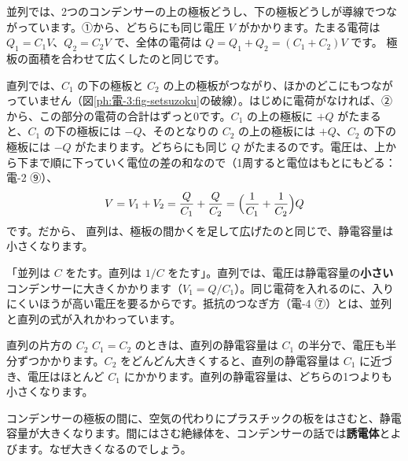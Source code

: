 並列では、2つのコンデンサーの上の極板どうし、下の極板どうしが導線でつながっています。①から、どちらにも同じ電圧 $V$ がかかります。たまる電荷は $Q_1=C_1V$、$Q_2=C_2V$ で、全体の電荷は $Q=Q_1+Q_2=(C_1+C_2)V$ です。
極板の面積を合わせて広くしたのと同じです。

直列では、$C_1$ の下の極板と $C_2$ の上の極板がつながり、ほかのどこにもつながっていません（図\ref{ph:電-3:fig-setsuzoku}の破線）。はじめに電荷がなければ、②から、この部分の電荷の合計はずっと0です。$C_1$ の上の極板に $+Q$ がたまると、$C_1$ の下の極板には $-Q$、そのとなりの $C_2$ の上の極板には $+Q$、$C_2$ の下の極板には $-Q$ がたまります。どちらにも同じ $Q$ がたまるのです。電圧は、上から下まで順に下っていく電位の差の和なので（1周すると電位はもとにもどる：電-2 ⑨）、
\[V=V_1+V_2=\frac{Q}{C_1}+\frac{Q}{C_2}=\Bigl(\frac1{C_1}+\frac1{C_2}\Bigr)Q\]
です。だから、
\label{ph:電-3:setsuzoku}直列は、極板の間かくを足して広げたのと同じで、静電容量は小さくなります。

\begin{phyomi}[並列と直列]
「並列は $C$ をたす。直列は $1/C$ をたす」。直列では、電圧は静電容量の\textbf{小さい}コンデンサーに大きくかかります（$V_1=Q/C_1$）。同じ電荷を入れるのに、入りにくいほうが高い電圧を要るからです。抵抗のつなぎ方（電-4 ⑦）とは、並列と直列の式が入れかわっています。
\end{phyomi}

\begin{phbaisuru}{直列の片方の $C_2$}
$C_1=C_2$ のときは、直列の静電容量は $C_1$ の半分で、電圧も半分ずつかかります。$C_2$ をどんどん大きくすると、直列の静電容量は $C_1$ に近づき、電圧はほとんど $C_1$ にかかります。直列の静電容量は、どちらの1つよりも小さくなります。
\end{phbaisuru}

\label{ph:電-3:sec6}
コンデンサーの極板の間に、空気の代わりにプラスチックの板をはさむと、静電容量が大きくなります。間にはさむ絶縁体を、コンデンサーの話では\textbf{誘電体}とよびます。なぜ大きくなるのでしょう。

